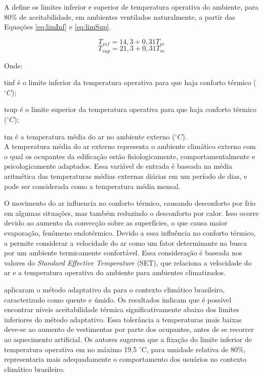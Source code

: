 \documentclass[brazil,hardcopy,openany]{ufscthesis} %
\begin{document}
A  define os limites inferior e superior de temperatura operativa do ambiente, para 80\% de aceitabilidade, em ambientes ventilados naturalmente, a partir das Equações \ref{eq:limInf} e \ref{eq:limSup}.

\begin{equation}\label{eq:limInf}
T_{inf} = 14,3 + 0,31 T_m
\end{equation}
\begin{equation}\label{eq:limSup}
T_{sup} = 21,3 + 0,31 T_m
\end{equation}

Onde:

\gls{tinf} é o limite inferior da temperatura operativa para que haja conforto térmico ($^{\circ}C$);

\gls{tsup} é o limite superior da temperatura operativa para que haja conforto térmico ($^{\circ}C$);

\gls{tm} é a temperatura média do ar no ambiente externo ($^{\circ}C$).
\\

A temperatura média do ar externo representa o ambiente climático externo com o qual os ocupantes da edificação estão fisiologicamente,
comportamentalmente e psicologicamente adaptados. Essa variável de entrada é baseada na média aritmética das temperaturas médias externas diárias em um período de dias, e pode ser considerada como a temperatura média mensal.

O movimento do ar influencia no conforto térmico, causando desconforto por frio em algumas situações, mas também reduzindo o desconforto por calor.
Isso ocorre devido ao aumento da convecção sobre as superfícies, o que causa maior evaporação, fenômeno endotérmico. Devido a essa influência no conforto térmico, a  permite considerar a velocidade do ar como um fator determinante na busca por um ambiente termicamente confortável. Essa consideração é baseada nos valores do  \textit{Standard Effective Temperature} (SET), que relaciona a velocidade do ar e a temperatura operativa do ambiente para ambientes climatizados.

 aplicaram o método adaptativo da  para o contexto climático brasileiro, caracterizado como quente e úmido. Os resultados indicam que é possível encontrar níveis aceitabilidade térmica significativamente abaixo dos limites inferiores do método adaptativo. Essa tolerância a temperaturas mais baixas deve-se ao aumento de vestimentas por parte dos ocupantes, antes de se recorrer ao aquecimento artificial. Os autores sugerem que a fixação do limite inferior de temperatura operativa em no máximo 19,5 $^{\circ}$C, para umidade relativa de 80\%, representaria mais adequadamente o comportamento dos usuários no contexto climático brasileiro.
\end{document}
